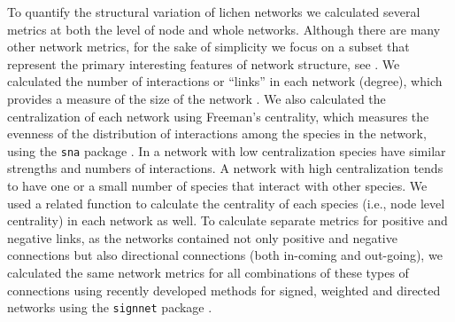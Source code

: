 \documentclass[fleqn,12pt]{olplainarticle}
\begin{document}
To quantify the structural variation of lichen networks we calculated
several metrics at both the level of node and whole networks. Although
there are many other network metrics, for the sake of simplicity we
focus on a subset that represent the primary interesting features of
network structure, see \cite{Lau2017a}. We calculated the number of
interactions or ``links'' in each network (degree), which provides a
measure of the size of the network \citep{Lau2016afix,
  Borrett2014EnaR:Analysis}. We also calculated the centralization of
each network using Freeman's centrality, which measures the evenness
of the distribution of interactions among the species in the network,
using the \texttt{sna} package \citep{sna}. In a network with low
centralization species have similar strengths and numbers of
interactions. A network with high centralization tends to have one or
a small number of species that interact with other species. We used a
related function to calculate the centrality of each species (i.e.,
node level centrality) in each network as well. To calculate separate
metrics for positive and negative links, as the networks contained not
only positive and negative connections but also directional
connections (both in-coming and out-going), we calculated the same
network metrics for all combinations of these types of connections
using recently developed methods for signed, weighted and directed
networks \citep{Everett2014NetworksTies} using the \texttt{signnet}
package \citep{signnet}.
\end{document}
